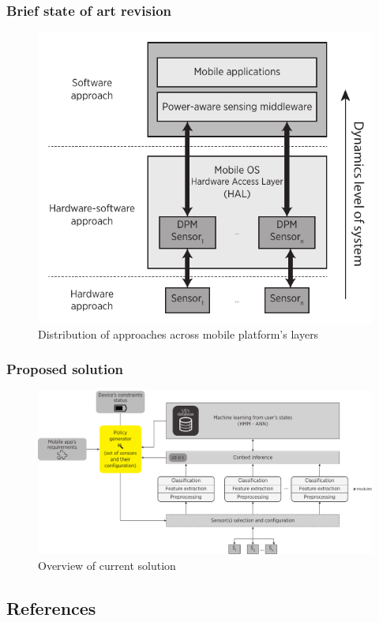\documentclass[compress,9pt,xcolor={dvipsnames,table}]{beamer}
\begin{document}
\begin{frame}\frametitle{Brief state of art revision}
\begin{figure}[tb]
  \centering
  \includegraphics[scale=0.72]{../../../resources/images/vectors/approaches-distribution}
  \caption{Distribution of approaches across mobile platform's layers}
  \label{fig:distribution}
\end{figure}
\end{frame}

\begin{frame}\frametitle{Proposed solution}
\begin{figure}[tb]
  \centering
  \includegraphics[width=\textwidth]{../../../resources/images/vectors/policy-manager-incorporation}
  \caption{Overview of current solution}
  \label{fig:solution}
\end{figure}
\end{frame}

\subsection{References}

% 

\end{document}
